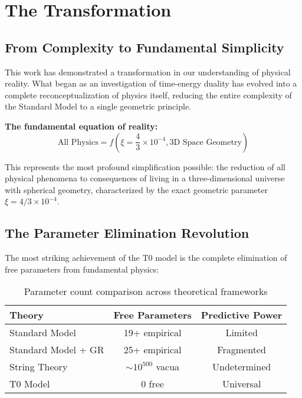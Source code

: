 \documentclass[12pt,a4paper]{report}
\begin{document}
\section{The Transformation}
\label{sec:revolutionary_transformation}

\subsection{From Complexity to Fundamental Simplicity}
\label{subsec:complexity_to_simplicity}

This work has demonstrated a transformation in our understanding of physical reality. What began as an investigation of time-energy duality has evolved into a complete reconceptualization of physics itself, reducing the entire complexity of the Standard Model to a single geometric principle.

\textbf{The fundamental equation of reality:}
\begin{equation}
	\boxed{\text{All Physics} = f\left(\xi = \frac{4}{3} \times 10^{-4}, \text{3D Space Geometry}\right)}
\end{equation}

This represents the most profound simplification possible: the reduction of all physical phenomena to consequences of living in a three-dimensional universe with spherical geometry, characterized by the exact geometric parameter $\xi = 4/3 \times 10^{-4}$.

\subsection{The Parameter Elimination Revolution}
\label{subsec:parameter_elimination}

The most striking achievement of the T0 model is the complete elimination of free parameters from fundamental physics:

\begin{table}[htbp]
	\centering
	\begin{tabular}{lcc}
		\toprule
		\textbf{Theory} & \textbf{Free Parameters} & \textbf{Predictive Power} \\
		\midrule
		Standard Model & 19+ empirical & Limited \\
		Standard Model + GR & 25+ empirical & Fragmented \\
		String Theory & $\sim 10^{500}$ vacua & Undetermined \\
		T0 Model & 0 free & Universal \\
		\bottomrule
	\end{tabular}
	\caption{Parameter count comparison across theoretical frameworks}
	\label{tab:parameter_comparison}
\end{table}
\end{document}
